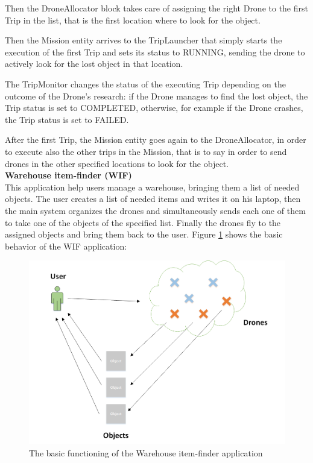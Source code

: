 Then the DroneAllocator block takes care of assigning the right Drone to the first Trip in the list, that is the first location where to look for the object.

Then the Mission entity arrives to the TripLauncher that simply starts the execution of the first Trip and sets its status to RUNNING, sending the drone to actively look for the lost object in that location.

The TripMonitor changes the status of the executing Trip depending on the outcome of the Drone's research:
if the Drone manages to find the lost object, the Trip status is set to COMPLETED, otherwise, for example if the Drone crashes, the Trip status is set to FAILED.

After the first Trip, the Mission entity goes again to the DroneAllocator, in order to execute also the other trips in the Mission, that is to say in order to send drones in the other specified locations to look for the object.
\\

\textbf{Warehouse item-finder (WIF)}
\\

This application help users manage a warehouse, bringing them a list of needed objects.
The user creates a list of needed items and writes it on his laptop, then
the main system organizes the drones and simultaneously sends each one of them to take one of the objects of the specified list.
Finally the drones fly to the assigned objects and bring them back to the user.
Figure \ref{fig:WIS} shows the basic behavior of the WIF application:

\begin{figure}[H]
  \centering
  \includegraphics[width=\linewidth]{pictures/WIF.png}
  \caption{The basic functioning of the Warehouse item-finder application}
  \label{fig:WIS}
\end{figure}

